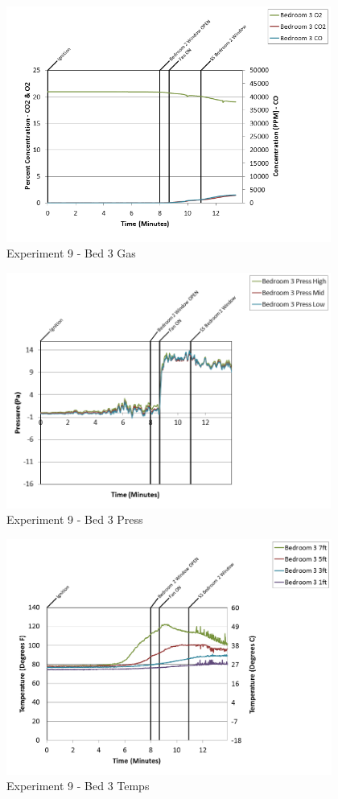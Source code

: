 \documentclass{article}
\begin{document}
\begin{appendices}
\clearpage

\begin{figure}[h!]
	\centering
	\includegraphics[height=3.05in]{0_Images/Results_Charts/Exp_9_Charts/Bed3Gas.png}
	\caption{Experiment 9 - Bed 3 Gas}
\end{figure}


\begin{figure}[h!]
	\centering
	\includegraphics[height=3.05in]{0_Images/Results_Charts/Exp_9_Charts/Bed3Press.png}
	\caption{Experiment 9 - Bed 3 Press}
\end{figure}

\clearpage

\begin{figure}[h!]
	\centering
	\includegraphics[height=3.05in]{0_Images/Results_Charts/Exp_9_Charts/Bed3Temps.png}
	\caption{Experiment 9 - Bed 3 Temps}
\end{figure}



\end{appendices}
\end{document}
